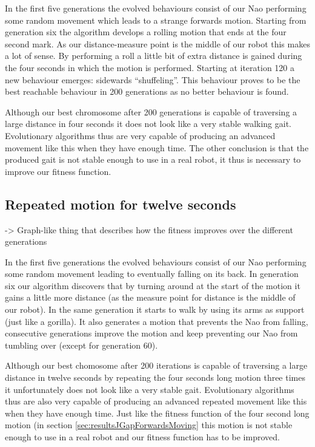 \documentclass[a4paper,10pt]{article}
\begin{document}
In the first five generations the evolved behaviours consist of our Nao performing some random movement which leads to a strange forwards motion. Starting from generation six the algorithm develops a rolling motion that ends at the four second mark. As our distance-measure point is the middle of our robot this makes a lot of sense. By performing a roll a little bit of extra distance is gained during the four seconds in which the motion is performed. Starting at iteration 120 a new behaviour emerges: sidewards “shuffeling”. This behaviour proves to be the best reachable behaviour in 200 generations as no better behaviour is found. 

Although our best chromosome after 200 generations is capable of traversing a large distance in four seconds it does not look like a very stable walking gait. Evolutionary algorithms thus are very capable of producing an advanced movement like this when they have enough time. The other conclusion is that the produced gait is not stable enough to use in a real robot, it thus is necessary to improve our fitness function. 

\subsection{Repeated motion for twelve seconds}
\label{sec:resultsJGapForwardsMovingTwelveSeconds}
-> Graph-like thing that describes how the fitness improves over the different generations

In the first five generations the evolved behaviours consist of our Nao performing some random movement leading to eventually falling on its back. In generation six our algorithm discovers that by turning around at the start of the motion it gains a little more distance (as the measure point for distance is the middle of our robot). In the same generation it starts to walk by using its arms as support (just like a gorilla). It also generates a motion that prevents the Nao from falling, consecutive generations improve the motion and keep preventing our Nao from tumbling over (except for generation 60).

Although our best chomosome after 200 iterations is capable of traversing a large distance in twelve seconds by repeating the four seconds long motion three times it unfortunately does not look like a very stable gait. Evolutionary algorithms thus are also very capable of producing an advanced repeated movement like this when they have enough time. Just like the fitness function of the four second long motion (in section \ref{sec:resultsJGapForwardsMoving} this motion is not stable enough to use in a real robot and our fitness function has to be improved. 
\end{document}
